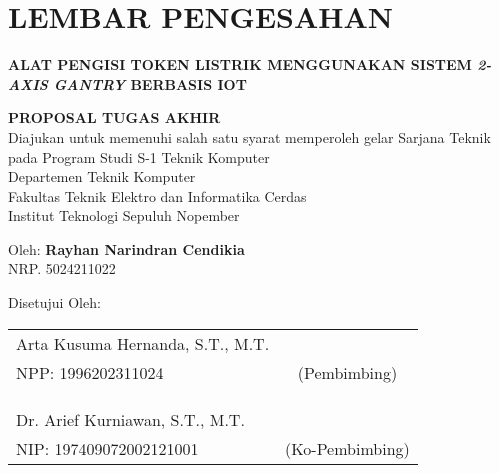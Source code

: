 \chapter*{LEMBAR PENGESAHAN}

\thispagestyle{empty}

\begin{center}
  \textbf{ALAT PENGISI TOKEN LISTRIK MENGGUNAKAN SISTEM \emph{2-AXIS GANTRY} BERBASIS IOT}
\end{center}

\begingroup
\small

\begin{center}
  \textbf{PROPOSAL TUGAS AKHIR} \\
  Diajukan untuk memenuhi salah satu syarat memperoleh gelar
  Sarjana Teknik pada
  Program Studi S-1 Teknik Komputer \\
  Departemen Teknik Komputer \\
  Fakultas Teknik Elektro dan Informatika Cerdas \\
  Institut Teknologi Sepuluh Nopember
\end{center}

\begin{center}
  Oleh: \textbf{Rayhan Narindran Cendikia} \\
  NRP. 5024211022
\end{center}

\begin{center}
  Disetujui Oleh:
\end{center}

\vspace{10ex}

\begingroup
\setlength{\tabcolsep}{0pt}

\noindent
\begin{tabularx}{\textwidth}{X c}
  Arta Kusuma Hernanda, S.T., M.T.      &                 \\
  NPP: 1996202311024                    & (Pembimbing)    \\
                                        &                 \\
                                        &                 \\
                                        &                 \\
  Dr. Arief Kurniawan, S.T., M.T.       &                 \\
  NIP: 197409072002121001                 & (Ko-Pembimbing) \\
\end{tabularx}
\endgroup

